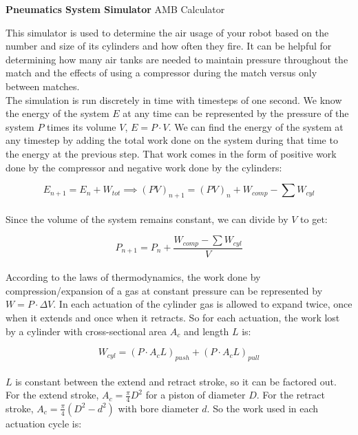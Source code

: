 \documentclass[a4paper]{article}
\begin{document}
	
	\Huge\textbf{Pneumatics System Simulator}
	\newline
	\LARGE AMB Calculator
	
	\vspace{0.5cm}
	\normalsize
	
	This simulator is used to determine the air usage of your robot based on the number and size of its cylinders and how often they fire. It can be helpful for determining how many air tanks are needed to maintain pressure throughout the match and the effects of using a compressor during the match versus only between matches.\\
	
	The simulation is run discretely in time with timesteps of one second. We know the energy of the system $ E $ at any time can be represented by the pressure of the system $ P $ times its volume $ V $, $ E = P \cdot V $. We can find the energy of the system at any timestep by adding the total work done on the system during that time to the energy at the previous step. That work comes in the form of positive work done by the compressor and negative work done by the cylinders:
	
	\begin{equation}
		E_{n+1} = E_n + W_{tot} \implies 
		\left( P V \right)_{n+1} = \left( P V \right)_n + W_{comp} - \sum W_{cyl}
	\end{equation}
	\\
	Since the volume of the system remains constant, we can divide by $ V $ to get:
	
	\begin{equation}
		P_{n+1} = P_n + \frac{W_{comp} - \sum W_{cyl}}{V}
	\end{equation}
	\\
	According to the laws of thermodynamics, the work done by compression/expansion of a gas at constant pressure can be represented by $ W = P \cdot \Delta V $. In each actuation of the cylinder gas is allowed to expand twice, once when it extends and once when it retracts. So for each actuation, the work lost by a cylinder with cross-sectional area $ A_c $ and length $ L $ is:
	
	\begin{equation}
		W_{cyl} = \left( P \cdot A_c L \right)_{push} + \left( P \cdot A_c L \right)_{pull}
	\end{equation}
	\\
	$ L $ is constant between the extend and retract stroke, so it can be factored out. For the extend stroke, $ A_c = \frac{\pi}{4} D^2 $ for a piston of diameter $ D $. For the retract stroke, $ A_c = \frac{\pi}{4} \left( D^2 - d^2 \right) $ with bore diameter $ d $. So the work used in each actuation cycle is:
	
\end{document}
